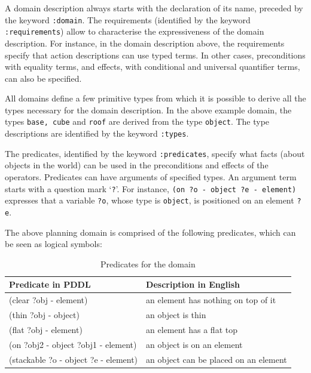 A domain description always starts with the declaration of its name, preceded by the keyword \texttt{:domain}. 
The requirements (identified by the keyword \texttt{:requirements}) allow to characterise the expressiveness of the domain description. 
For instance, in the domain description above, the requirements specify that action descriptions can use typed terms. In other cases, preconditions with equality terms, and effects, with conditional and universal quantifier terms, can also be specified. 

All domains define a few primitive types from which it is possible to derive all the types necessary for the domain description. 
In the above example domain, the types \texttt{base, cube} and \texttt{roof} are derived from the type \texttt{object}. 
The type descriptions are identified by the keyword \texttt{:types}. 

The predicates, identified by the keyword \texttt{:predicates}, specify what facts (about objects in the world) can be used in the preconditions and effects of the operators.
Predicates can have arguments of specified types. 
An argument term starts with a question mark `\texttt{?}'. 
For instance, \texttt{(on ?o - object ?e - element)} expresses that a variable \texttt{?o}, whose type is \texttt{object}, is positioned on an element \texttt{?e}.

The above planning domain is comprised of the following predicates, which can be seen as logical symbols:

\begin{table}[h]
\begin{center}
\begin{tabular}{l|l}
Predicate in PDDL & Description in English\\ \hline
(clear ?obj - element) & an element has nothing on top of it \\
(thin ?obj - object) & an object is thin\\
(flat ?obj - element) & an element has a flat top \\
(on ?obj2 - object ?obj1 - element)& an object is on an element\\
(stackable ?o - object ?e - element) & an object can be placed on an element\\
\end{tabular}
\end{center}
\label{tab:predicates}
\caption{Predicates for the \texttt{} domain}
\end{table}%


